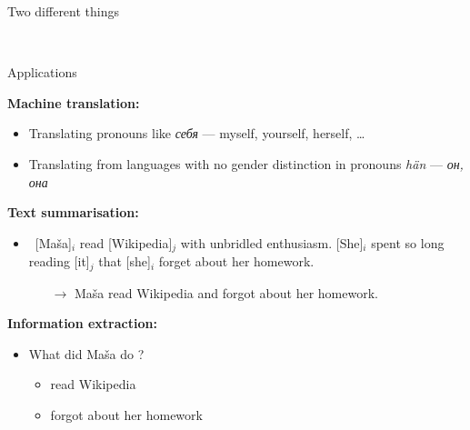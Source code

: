 \documentclass[dvipsnames, 10pt, compress]{beamer}
\begin{document}
\begin{frame}{Two different things}



~\\


\end{frame}

\begin{frame}{Applications}

\textbf{Machine translation:}
\begin{itemize}
  \item Translating pronouns like \emph{себя} --- myself, yourself, herself, \ldots
  \item Translating from languages with no gender distinction in pronouns \emph{hän} --- \emph{он, она}
\end{itemize}

\textbf{Text summarisation:}
\begin{itemize}
  \item ~[Maša]$_i$ read [Wikipedia]$_j$ with unbridled enthusiasm. [She]$_i$ spent so long reading [it]$_j$ that [she]$_i$ 
     forget about her homework. 
     \begin{itemize}
        \item[$\rightarrow$] Maša read Wikipedia and forgot about her homework.
     \end{itemize}
\end{itemize}
\textbf{Information extraction:}
\begin{itemize}
  \item What did Maša do ? 
  \begin{itemize}
    \item read Wikipedia
    \item forgot about her homework
  \end{itemize}
\end{itemize}

\end{frame}
\end{document}
